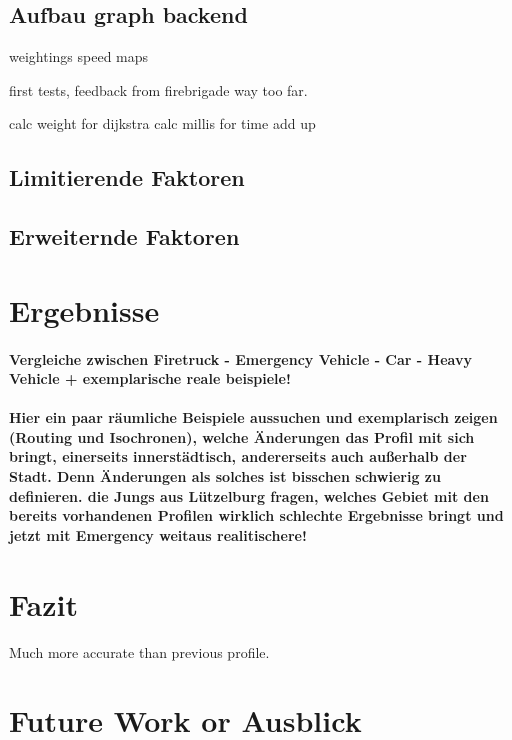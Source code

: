 \documentclass[10pt,a4paper]{article}
\begin{document}
\subsection{Aufbau graph backend}

weightings 
speed maps

first tests, feedback from firebrigade
way too far.

calc weight for dijkstra
calc millis for time add up



\subsection{Limitierende Faktoren}

\subsection{Erweiternde Faktoren}

\section{Ergebnisse}
\paragraph{
Vergleiche zwischen Firetruck - Emergency Vehicle - Car - Heavy Vehicle
+ exemplarische reale beispiele!
}
\paragraph{
\color{red}
Hier ein paar räumliche Beispiele aussuchen und exemplarisch zeigen (Routing und Isochronen), welche Änderungen das Profil mit sich bringt, einerseits innerstädtisch, andererseits auch außerhalb der Stadt. Denn Änderungen als solches ist bisschen schwierig zu definieren. die Jungs aus Lützelburg fragen, welches Gebiet mit den bereits vorhandenen Profilen wirklich schlechte Ergebnisse bringt und jetzt mit Emergency weitaus realitischere!
}

\section{Fazit}

Much more accurate than previous profile. 

\section{Future Work or Ausblick}
\end{document}
